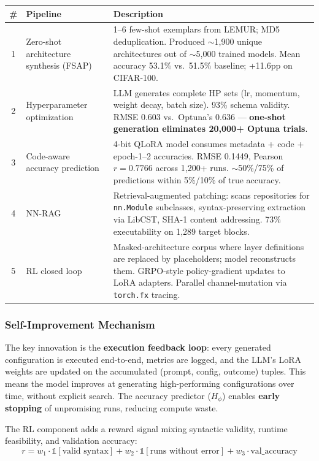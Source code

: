 \documentclass[11pt,a4paper]{article}
\begin{document}
\begin{center}
\begin{longtable}{c p{3cm} p{7cm}}
\hline
\textbf{\#} & \textbf{Pipeline} & \textbf{Description} \\
\hline
\endhead
1 & Zero-shot architecture synthesis (FSAP) & 1--6 few-shot exemplars from LEMUR; MD5 deduplication. Produced $\sim$1,900 unique architectures out of $\sim$5,000 trained models. Mean accuracy 53.1\% vs.\ 51.5\% baseline; +11.6pp on CIFAR-100. \\
2 & Hyperparameter optimization & LLM generates complete HP sets (lr, momentum, weight decay, batch size). 93\% schema validity. RMSE 0.603 vs.\ Optuna's 0.636 --- \textbf{one-shot generation eliminates 20,000+ Optuna trials}. \\
3 & Code-aware accuracy prediction & 4-bit QLoRA model consumes metadata + code + epoch-1--2 accuracies. RMSE 0.1449, Pearson $r = 0.7766$ across 1,200+ runs. $\sim$50\%/75\% of predictions within 5\%/10\% of true accuracy. \\
4 & NN-RAG & Retrieval-augmented patching: scans repositories for \texttt{nn.Module} subclasses, syntax-preserving extraction via LibCST, SHA-1 content addressing. 73\% executability on 1,289 target blocks. \\
5 & RL closed loop & Masked-architecture corpus where layer definitions are replaced by placeholders; model reconstructs them. GRPO-style policy-gradient updates to LoRA adapters. Parallel channel-mutation via \texttt{torch.fx} tracing. \\
\hline
\end{longtable}
\end{center}

\subsubsection{Self-Improvement Mechanism}

The key innovation is the \textbf{execution feedback loop}: every generated configuration is executed end-to-end, metrics are logged, and the LLM's LoRA weights are updated on the accumulated (prompt, config, outcome) tuples. This means the model improves at generating high-performing configurations over time, without explicit search. The accuracy predictor ($H_\phi$) enables \textbf{early stopping} of unpromising runs, reducing compute waste.

The RL component adds a reward signal mixing syntactic validity, runtime feasibility, and validation accuracy:
\begin{equation}
r = w_1 \cdot \mathbb{1}[\text{valid syntax}] + w_2 \cdot \mathbb{1}[\text{runs without error}] + w_3 \cdot \text{val\_accuracy}
\end{equation}
\end{document}
